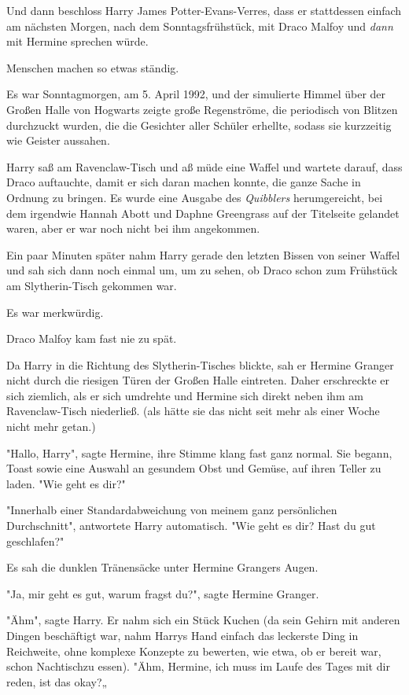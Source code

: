 {Und dann beschloss Harry James Potter-Evans-Verres, dass er stattdessen einfach am nächsten Morgen, nach dem Sonntagsfrühstück, mit Draco Malfoy und \emph{dann} mit Hermine sprechen würde.

Menschen machen so etwas ständig.

Es war Sonntagmorgen, am 5. April 1992, und der simulierte Himmel über der Großen Halle von Hogwarts zeigte große Regenströme, die periodisch von Blitzen durchzuckt wurden, die die Gesichter aller Schüler erhellte, sodass sie kurzzeitig wie Geister aussahen.

Harry saß am Ravenclaw-Tisch und aß müde eine Waffel und wartete darauf, dass Draco auftauchte, damit er sich daran machen konnte, die ganze Sache in Ordnung zu bringen. Es wurde eine Ausgabe des \emph{Quibblers} herumgereicht, bei dem irgendwie Hannah Abott und Daphne Greengrass auf der Titelseite gelandet waren, aber er war noch nicht bei ihm angekommen.

Ein paar Minuten später nahm Harry gerade den letzten Bissen von seiner Waffel und sah sich dann noch einmal um, um zu sehen, ob Draco schon zum Frühstück am Slytherin-Tisch gekommen war.

Es war merkwürdig.

Draco Malfoy kam fast nie zu spät.

Da Harry in die Richtung des Slytherin-Tisches blickte, sah er Hermine Granger nicht durch die riesigen Türen der Großen Halle eintreten. Daher erschreckte er sich ziemlich, als er sich umdrehte und Hermine sich direkt neben ihm am Ravenclaw-Tisch niederließ. (als hätte sie das nicht seit mehr als einer Woche nicht mehr getan.)

"Hallo, Harry", sagte Hermine, ihre Stimme klang fast ganz normal. Sie begann, Toast sowie eine Auswahl an gesundem Obst und Gemüse, auf ihren Teller zu laden. "Wie geht es dir?"

"Innerhalb einer Standardabweichung von meinem ganz persönlichen Durchschnitt", antwortete Harry automatisch. "Wie geht es dir? Hast du gut geschlafen?"

Es sah die dunklen Tränensäcke unter Hermine Grangers Augen.

"Ja, mir geht es gut, warum fragst du?", sagte Hermine Granger.

"Ähm", sagte Harry. Er nahm sich ein Stück Kuchen (da sein Gehirn mit anderen Dingen beschäftigt war, nahm Harrys Hand einfach das leckerste Ding in Reichweite, ohne komplexe Konzepte zu bewerten, wie etwa, ob er bereit war, schon Nachtischzu essen). "Ähm, Hermine, ich muss im Laufe des Tages mit dir reden, ist das okay?„

}

